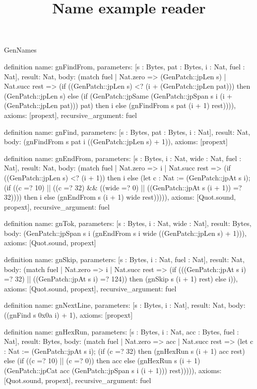 \begin{lexlean}{GenNames}
\title{Name example reader}
\begin{semanticmodule}
definition{
  name: gnFindFrom,
  parameters: [s : Bytes, pat : Bytes, i : Nat, fuel : Nat],
  result: Nat,
  body: (match fuel
    | Nat.zero => (GenPatch::jpLen s)
    | Nat.succ rest => (if ((GenPatch::jpLen s) <? (i + (GenPatch::jpLen pat))) then (GenPatch::jpLen s) else (if (GenPatch::jpSame (GenPatch::jpSpan s i (i + (GenPatch::jpLen pat))) pat) then i else (gnFindFrom s pat (i + 1) rest)))),
  axioms: [propext],
  recursive_argument: fuel
}

definition{
  name: gnFind,
  parameters: [s : Bytes, pat : Bytes, i : Nat],
  result: Nat,
  body: (gnFindFrom s pat i ((GenPatch::jpLen s) + 1)),
  axioms: [propext]
}

definition{
  name: gnEndFrom,
  parameters: [s : Bytes, i : Nat, wide : Nat, fuel : Nat],
  result: Nat,
  body: (match fuel
    | Nat.zero => i
    | Nat.succ rest => (if ((GenPatch::jpLen s) <? (i + 1)) then i else (let c : Nat := (GenPatch::jpAt s i); (if ((c =? 10) || ((c =? 32) && ((wide =? 0) || ((GenPatch::jpAt s (i + 1)) =? 32)))) then i else (gnEndFrom s (i + 1) wide rest))))),
  axioms: [Quot.sound, propext],
  recursive_argument: fuel
}

definition{
  name: gnTok,
  parameters: [s : Bytes, i : Nat, wide : Nat],
  result: Bytes,
  body: (GenPatch::jpSpan s i (gnEndFrom s i wide ((GenPatch::jpLen s) + 1))),
  axioms: [Quot.sound, propext]
}

definition{
  name: gnSkip,
  parameters: [s : Bytes, i : Nat, fuel : Nat],
  result: Nat,
  body: (match fuel
    | Nat.zero => i
    | Nat.succ rest => (if (((GenPatch::jpAt s i) =? 32) || ((GenPatch::jpAt s i) =? 124)) then (gnSkip s (i + 1) rest) else i)),
  axioms: [Quot.sound, propext],
  recursive_argument: fuel
}

definition{
  name: gnNextLine,
  parameters: [s : Bytes, i : Nat],
  result: Nat,
  body: ((gnFind s 0x0a i) + 1),
  axioms: [propext]
}

definition{
  name: gnHexRun,
  parameters: [s : Bytes, i : Nat, acc : Bytes, fuel : Nat],
  result: Bytes,
  body: (match fuel
    | Nat.zero => acc
    | Nat.succ rest => (let c : Nat := (GenPatch::jpAt s i); (if (c =? 32) then (gnHexRun s (i + 1) acc rest) else (if ((c =? 10) || (c =? 0)) then acc else (gnHexRun s (i + 1) (GenPatch::jpCat acc (GenPatch::jpSpan s i (i + 1))) rest))))),
  axioms: [Quot.sound, propext],
  recursive_argument: fuel
}


\end{semanticmodule}
\end{lexlean}
